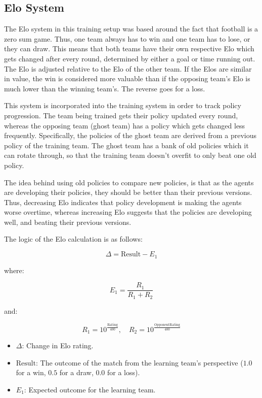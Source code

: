 \documentclass{LSkill}
\begin{document}
\subsection{Elo System}
The Elo system in this training setup was based around the fact that football is a zero sum game. Thus, one team always has to win and one team has to lose, or they can draw. This means that both teams have their own respective Elo which gets changed after every round, determined by either a goal or time running out. The Elo is adjusted relative to the Elo of the other team. If the Elos are similar in value, the win is considered more valuable than if the opposing team’s Elo is much lower than the winning team’s. The reverse goes for a loss. 

This system is incorporated into the training system in order to track policy progression. The team being trained gets their policy updated every round, whereas the opposing team (ghost team) has a policy which gets changed less frequently. Specifically, the policies of the ghost team are derived from a previous policy of the training team. The ghost team has a bank of old policies which it can rotate through, so that the training team doesn’t overfit to only beat one old policy. 

The idea behind using old policies to compare new policies, is that as the agents are developing their policies, they should be better than their previous versions. Thus, decreasing Elo indicates that policy development is making the agents worse overtime, whereas increasing Elo suggests that the policies are developing well, and beating their previous versions. 

The logic of the Elo calculation is as follows:

\[
\Delta = \text{Result} - E_1
\]

where:

\[
E_1 = \frac{R_1}{R_1 + R_2}
\]

and:

\[
R_1 = 10^{\frac{\text{Rating}}{400}}, \quad R_2 = 10^{\frac{\text{OpponentRating}}{400}}
\]

\begin{itemize}
    \item \(\Delta\): Change in Elo rating.
    \item \(\text{Result}\): The outcome of the match from the learning team's perspective (\(1.0\) for a win, \(0.5\) for a draw, \(0.0\) for a loss).
    \item \(E_1\): Expected outcome for the learning team.
\end{itemize}
\end{document}

